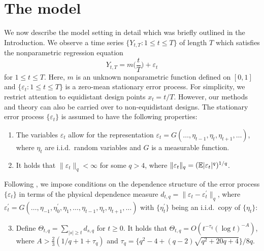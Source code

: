 
\section{The model}\label{sec-model}


We now describe the model setting in detail which was briefly outlined in the Introduction. We observe a time series $\{Y_{t,T}: 1 \le t \le T \}$ of length $T$ which satisfies the nonparametric regression equation 
\begin{equation}\label{model}
Y_{t,T} = m \Big( \frac{t}{T} \Big) + \varepsilon_t 
\end{equation}
for $1 \le t \le T$. Here, $m$ is an unknown nonparametric function defined on $[0,1]$ and $\{ \varepsilon_t: 1 \le t \le T \}$ is a zero-mean stationary error process. For simplicity, we restrict attention to equidistant design points $x_t = t/T$. However, our methods and theory can also be carried over to non-equidistant designs. The stationary error process $\{\varepsilon_t\}$ is assumed to have the following properties: 
\newpage
\begin{enumerate}[label=(C\arabic*),leftmargin=1.05cm]

\item \label{C-err1} The variables $\varepsilon_t$ allow for the representation $\varepsilon_t = G(\ldots,\eta_{t-1},\eta_t,\eta_{t+1},\ldots)$, where $\eta_t$ are i.i.d.\ random variables and $G$ is a measurable function. 

\item \label{C-err2} It holds that $\| \varepsilon_t \|_q < \infty$ for some $q > 4$, where $\| \varepsilon_t \|_q = (\mathbb{E}|\varepsilon_t|^q)^{1/q}$. 

\end{enumerate}
Following \cite{Wu2005}, we impose conditions on the dependence structure of the error process $\{\varepsilon_t\}$ in terms of the physical dependence measure $d_{t,q} = \| \varepsilon_t - \varepsilon_t^\prime \|_q$, where $\varepsilon_t^\prime = G(\ldots,\eta_{-1},\eta_0^\prime,\eta_1,\ldots,\eta_{t-1},\eta_t,\eta_{t+1},\ldots)$ with $\{\eta_t^\prime\}$ being an i.i.d.\ copy of $\{\eta_t\}$: %
\begin{enumerate}[label=(C\arabic*),leftmargin=1.05cm]
\setcounter{enumi}{2}

\item \label{C-err3} Define $\Theta_{t,q} = \sum\nolimits_{|s| \ge t} d_{s,q}$ for $t \ge 0$. It holds that 
$\Theta_{t,q} = O ( t^{-\tau_q} (\log t)^{-A} )$,  
where $A > \frac{2}{3} (1/q + 1 + \tau_q)$ and $\tau_q = \{q^2 - 4 + (q-2) \sqrt{q^2 + 20q + 4}\} / 8q$. 

\end{enumerate}
